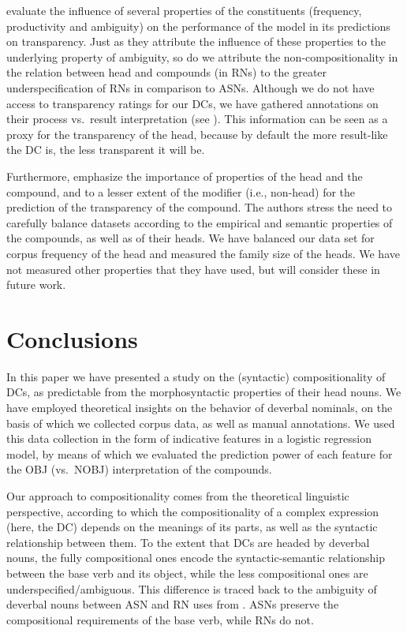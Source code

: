 \documentclass[output=paper]{langsci/langscibook}
\begin{document}
\cite{SchulteImWaldeEtAl:16} evaluate the influence of several properties of the constituents (frequency, productivity and ambiguity) on the performance of the model in its predictions on transparency. Just as they attribute the influence of these properties to the underlying property of ambiguity, 
so do we attribute the non-compositionality in the relation between head and compounds (in RNs) to the greater underspecification of RNs in comparison to ASNs. Although we do not have access to transparency ratings for our DCs, we have gathered annotations on their process vs.\ result interpretation (see ). This information can be seen as a proxy for the transparency of the head, because by default the more result-like the DC is, the less transparent it will be.

Furthermore, \cite{SchulteImWaldeEtAl:16} emphasize the importance of properties of the head and the compound, and to a lesser extent of the modifier (i.e., non-head) for the prediction of the  transparency of the compound.  The authors stress the need to carefully balance  datasets according to the empirical and semantic properties of the compounds, as well as of their heads. We have balanced our data set for corpus frequency of the head   and measured the family size of the heads. We have not measured  other properties that they have used, but will consider these in future work. 

\section{Conclusions}\label{sec:conclusions}

In this paper we have presented a study on the  {(syntactic)} compositionality of DCs, as predictable from the morphosyntactic properties of their head nouns. We have employed theoretical insights on the behavior of deverbal nominals, on the basis of which we collected corpus data, as well as manual annotations. We used this data collection in the form  of indicative features in a logistic regression model, by means of which we evaluated the prediction power of each feature for the OBJ (vs.~NOBJ) interpretation of the compounds. 

Our approach to compositionality comes from the theoretical linguistic perspective, according to which the compositionality of a complex expression (here, the DC) depends on the meanings of its parts, as well as the syntactic relationship between them. To the extent that DCs are headed by deverbal nouns, the fully compositional ones encode the syntactic-semantic relationship between the base verb and its object,  while the less compositional ones are underspecified/ambiguous. This difference is traced back to the ambiguity of deverbal nouns between ASN and RN uses from \cite{grimshaw:90}. ASNs preserve the compositional requirements of the base verb, while RNs do not.
\end{document}
